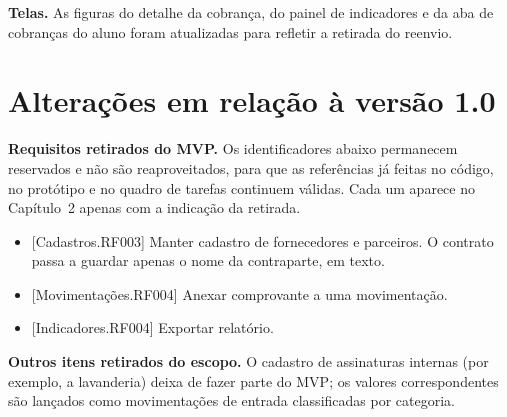 \documentclass[11pt,a4paper,oneside]{report}
\begin{document}
\textbf{Telas.} As figuras do detalhe da cobrança, do painel de indicadores e da aba de cobranças
do aluno foram atualizadas para refletir a retirada do reenvio.

\section*{Alterações em relação à versão 1.0}

\textbf{Requisitos retirados do MVP.} Os identificadores abaixo permanecem reservados e não são
reaproveitados, para que as referências já feitas no código, no protótipo e no quadro de tarefas
continuem válidas. Cada um aparece no Capítulo~2 apenas com a indicação da retirada.
\begin{itemize}
  \item {[Cadastros.RF003]} Manter cadastro de fornecedores e parceiros. O contrato passa a guardar
        apenas o nome da contraparte, em texto.
  \item {[Movimentações.RF004]} Anexar comprovante a uma movimentação.
  \item {[Indicadores.RF004]} Exportar relatório.
\end{itemize}

\textbf{Outros itens retirados do escopo.} O cadastro de assinaturas internas (por exemplo, a
lavanderia) deixa de fazer parte do MVP; os valores correspondentes são lançados como
movimentações de entrada classificadas por categoria.
\end{document}
